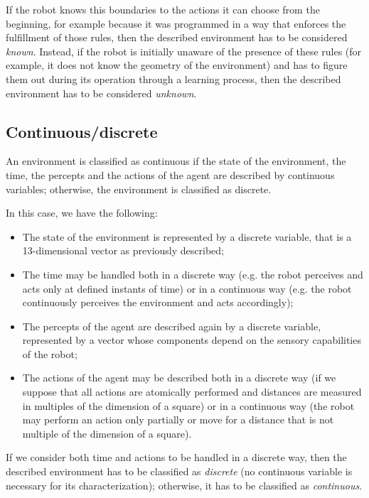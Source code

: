 \documentclass[letterpaper,headings=standardclasses]{scrartcl}
\begin{document}
If the robot knows this boundaries to the actions it can choose from the beginning, for example because it was programmed in a way that enforces the fulfillment of those rules, then the described environment has to be considered \emph{known}. Instead, if the robot is initially unaware of the presence of these rules (for example, it does not know the geometry of the environment) and has to figure them out during its operation through a learning process, then the described environment has to be considered \emph{unknown}.

\subsection{Continuous/discrete}

An environment is classified as continuous if the state of the environment, the time, the percepts and the actions of the agent are described by continuous variables; otherwise, the environment is classified as discrete.

In this case, we have the following:

\begin{itemize}

\item The state of the environment is represented by a discrete variable, that is a 13-dimensional vector as previously described;
\item The time may be handled both in a discrete way (e.g. the robot perceives and acts only at defined instants of time) or in a continuous way (e.g. the robot continuously perceives the environment and acts accordingly);
\item The percepts of the agent are described again by a discrete variable, represented by a vector whose components depend on the sensory capabilities of the robot;
\item The actions of the agent may be described both in a discrete way (if we suppose that all actions are atomically performed and distances are measured in multiples of the dimension of a square) or in a continuous way (the robot may perform an action only partially or move for a distance that is not multiple of the dimension of a square).

\end{itemize}

If we consider both time and actions to be handled in a discrete way, then the described environment has to be classified as \emph{discrete} (no continuous variable is necessary for its characterization); otherwise, it has to be classified as \emph{continuous}.
\end{document}
